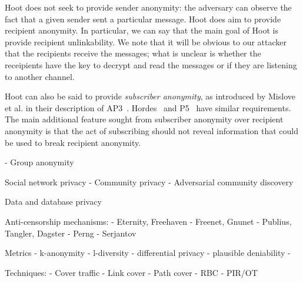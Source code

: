 Hoot does not seek to provide sender anonymity: the adversary can
observe the fact that a given sender sent a particular message.
Hoot does aim to provide recipient anonymity. In particular, we can say
that the main goal of Hoot is provide recipient unlinkability. We note
that it will be obvious to our attacker that the recipients receive the
messages; what is unclear is whether the receipients have the key to
decrypt and read the messages or if they are listening to another
channel.

Hoot can also be said to provide {\em subscriber anonymity}, as
introduced by Mislove et al. in their description of
AP3~\cite{ap3}. Hordes~\cite{hordes} and P5~\cite{P5} have similar
requirements. The main additional feature sought from subscriber anonymity
over recipient anonymity is that the act of subscribing should not
reveal information that could be used to break recipient anonymity.


- Group anonymity

Social network privacy
- Community privacy
- Adversarial community discovery

Data and database privacy

Anti-censorship mechanisms:
- Eternity, Freehaven
- Freenet, Gnunet
- Publius, Tangler, Dagster
- Perng
- Serjantov

Metrics
- k-anonymity
- l-diversity
- differential privacy
- plausible deniability
- 

Techniques:
- Cover traffic
- Link cover
- Path cover
- RBC
- PIR/OT
 


